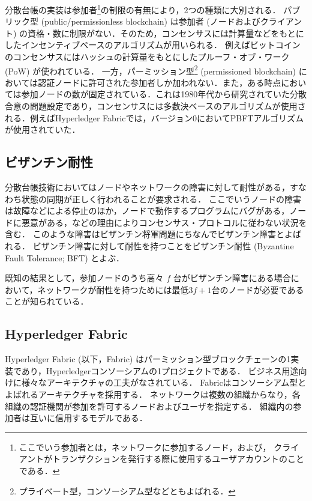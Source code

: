 \documentclass{fose2019}           %
\begin{document}
分散台帳の実装は参加者\footnote{ここでいう参加者とは，ネットワークに参加するノード，および，
クライアントがトランザクションを発行する際に使用するユーザアカウントのことである．}の制限の有無により，2つの種類に大別される．
パブリック型 (public/permissionless blockchain) は参加者 (ノードおよびクライアント) の資格・数に制限がない．そのため，コンセンサスには計算量などをもとにしたインセンティブベースのアルゴリズムが用いられる．
例えばビットコインのコンセンサスにはハッシュの計算量をもとにしたプルーフ・オブ・ワーク (PoW) が使われている．
一方，パーミッション型\footnote{プライベート型，コンソーシアム型などともよばれる．} (permissioned blockchain) においては認証ノードに許可された参加者しか加われない．また，ある時点においては参加ノードの数が固定されている．これは1980年代から研究されていた分散合意の問題設定であり，コンセンサスには多数決ベースのアルゴリズムが使用される．例えばHyperledger Fabricでは，バージョン0においてPBFTアルゴリズム\cite{Castro:PBFT:1999}が使用されていた．

\subsection{ビザンチン耐性}

分散台帳技術においてはノードやネットワークの障害に対して耐性がある，すなわち状態の同期が正しく行われることが要求される．
ここでいうノードの障害は故障などによる停止のほか，ノードで動作するプログラムにバグがある，ノードに悪意がある，などの理由によりコンセンサス・プロトコルに従わない状況を含む．
このような障害はビザンチン将軍問題\cite{byzgen}にちなんでビザンチン障害とよばれる．
ビザンチン障害に対して耐性を持つことをビザンチン耐性 (Byzantine Fault Tolerance; BFT) とよぶ．

既知の結果として，参加ノードのうち高々 $f$ 台がビザンチン障害にある場合において，ネットワークが耐性を持つためには最低$3f+1$台のノードが必要であることが知られている\cite{bft}．

\subsection{Hyperledger Fabric}

Hyperledger Fabric\cite{fabric} (以下，Fabric) はパーミッション型ブロックチェーンの1実装であり，Hyperledgerコンソーシアムの1プロジェクトである．
ビジネス用途向けに様々なアーキテクチャの工夫がなされている．
Fabricはコンソーシアム型とよばれるアーキテクチャを採用する．
ネットワークは複数の組織からなり，各組織の認証機関が参加を許可するノードおよびユーザを指定する．
組織内の参加者は互いに信用するモデルである．
\end{document}
